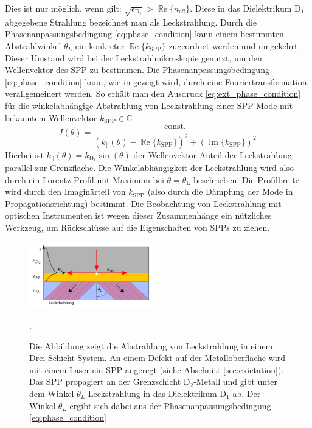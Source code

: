 \documentclass[titlepage,  ngerman]{article}
\renewcommand{\Re}{\operatorname{\mathbb{R}e}}
\renewcommand{\Im}{\operatorname{\mathbb{I}m}}
\begin{document}
	Dies ist nur möglich, wenn gilt: {$\sqrt{\epsilon_{\mathrm{D}_1}} > \Re\{n_\mathrm{eff}\}$}. Diese in das Dielektrikum $\mathrm{D}_1$ abgegebene Strahlung bezeichnet man als Leckstrahlung. Durch die Phasenanpassungsbedingung \eqref{eq:phase_condition} kann einem bestimmten Abstrahlwinkel $\theta_L$ ein konkreter $\Re\{k_{\mathrm{SPP}}\}$ zugeordnet werden und umgekehrt. Dieser Umstand wird bei der Leckstrahlmikroskopie genutzt, um den Wellenvektor des SPP zu bestimmen.
	Die Phasenanpassungsbedingung \eqref{eq:phase_condition} kann, wie in \cite{Burke.1986} gezeigt wird, durch eine Fouriertransformation verallgemeinert werden. So erhält man den Ausdruck \eqref{eq:ext_phase_condition} für die winkelabhängige Abstrahlung von Leckstrahlung einer SPP-Mode mit bekanntem Wellenvektor $k_{\mathrm{SPP}} \in \mathbb{C}$
	\begin{equation}
		\label{eq:ext_phase_condition}
		I(\theta) = \dfrac{\text{const.}}{\left(k_{\parallel}(\theta) - \Re\{k_{\mathrm{SPP}}\}\right)^2 + (\Im\{k_{\mathrm{SPP}}\})^2}
	\end{equation}
	Hierbei ist $k_{\parallel}(\theta) = k_{\mathrm{D}_1}\sin(\theta)$ der Wellenvektor-Anteil der Leckstrahlung parallel zur Grenzfläche. Die Winkelabhängigkeit der Leckstrahlung wird also durch ein Lorentz-Profil mit Maximum bei $\theta = \theta_\mathrm{L}$ beschrieben. Die Profilbreite wird durch den Imaginärteil von $k_{\mathrm{SPP}}$ (also durch die Dämpfung der Mode in Propagationsrichtung) bestimmt. Die Beobachtung von Leckstrahlung mit optischen Instrumenten ist wegen dieser Zusammenhänge ein nützliches Werkzeug, um Rückschlüsse auf die Eigenschaften von SPPs zu ziehen.
	\begin{figure}[h] 
		\centering
		\includegraphics[width=0.5\textwidth]{figures/leckstrahlung.pdf}
		\caption[Leckstrahlung Drei-Schicht-System]{Die Abbildung zeigt die Abstrahlung von Leckstrahlung in einem Drei-Schicht-System. An einem Defekt auf der Metalloberfläche wird mit einem Laser ein SPP angeregt (siehe Abschnitt \ref{sec:exictation}). Das SPP propagiert an der Grenzschicht $\mathrm{D}_2$-Metall und gibt unter dem Winkel $\theta_L$ Leckstrahlung in das Dielektrikum $\mathrm{D}_1$ ab. Der Winkel $\theta_L$ ergibt sich dabei aus der Phasenanpassungsbedingung \eqref{eq:phase_condition}}.
		\label{fig:leakage_radiation}
	\end{figure}
\end{document}
